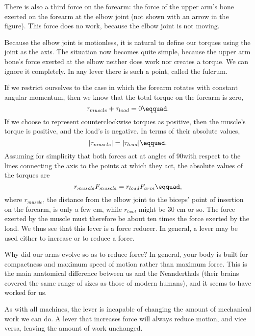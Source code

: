 There is also a third force on the forearm: the force of the
upper arm's bone exerted on the forearm at the elbow joint
(not shown with an arrow in the figure). This force does no
work, because the elbow joint is not moving.

Because the elbow joint is motionless, it is natural to
define our torques using the joint as the axis. The
situation now becomes quite simple, because the upper arm
bone's force exerted at the elbow neither does work nor
creates a torque. We can ignore it completely. In any lever
there is such a point, called the fulcrum.

If we restrict ourselves to the case in which the forearm
rotates with constant angular momentum, then we know that
the total torque on the forearm is zero,
\begin{equation*}
                \tau_{muscle} + \tau_{load}  =  0\eqquad.
\end{equation*}
 If we choose to represent counterclockwise torques as
positive, then the muscle's torque is positive, and the
load's is negative. In terms of their absolute values,
\begin{equation*}
                |\tau_{muscle}|  =  |\tau_{load}|\eqquad.
\end{equation*}
Assuming for simplicity that both forces act at angles of
90\degunit with respect to the lines connecting the axis to the
points at which they act, the absolute values of the torques are
\begin{equation*}
                r_{muscle} F_{muscle}  =  r_{load} F_{arm}\eqquad,
\end{equation*}
where $r_{muscle}$, the distance from the elbow joint to the
biceps' point of insertion on the forearm, is only a few cm,
while $r_{load}$ might be 30 cm or so. The force exerted by
the muscle must therefore be about ten times the force
exerted by the load. We thus see that this lever is a force
reducer. In general, a lever may be used either to increase
or to reduce a force.

Why did our arms evolve so as to reduce force? In general,
your body is built for compactness and maximum speed of
motion rather than maximum force. This is the main
anatomical difference between us and the Neanderthals
(their brains covered the same range of sizes as those of
modern humans), and it seems to have worked for us.

As with all machines, the lever is incapable of changing the
amount of mechanical work we can do. A lever that increases
force will always reduce motion, and vice versa, leaving the
amount of work unchanged.

